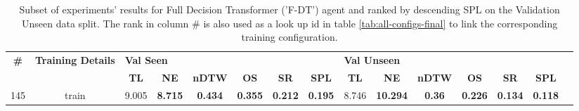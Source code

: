 \begin{table}
\centering
\caption{\label{tab:f_dt_action_for_final_pred}Subset of experiments' results for Full Decision Transformer ('F-DT') agent and ranked by descending SPL on the Validation Unseen data split. The rank in column \# is also used as a look up id in table \ref{tab:all-configs-final} to link the corresponding training configuration.}
\begin{tabular}{@{\hskip3pt}c@{\hskip3pt}c@{\hskip3pt}c@{\hskip3pt}c@{\hskip3pt}c@{\hskip3pt}c@{\hskip3pt}c@{\hskip3pt}c@{\hskip3pt}c@{\hskip3pt}c@{\hskip3pt}c@{\hskip3pt}c@{\hskip3pt}c@{\hskip3pt}c@{\hskip3pt}c}
\toprule
\textbf{\#} & \textbf{Training Details} & \multicolumn{6}{l}{\textbf{Val Seen}} & \multicolumn{6}{l}{\textbf{Val Unseen}} \\
 \textbf{~} &                \textbf{~} &       \textbf{TL} &     \textbf{NE} &   \textbf{nDTW} &     \textbf{OS} &     \textbf{SR} &    \textbf{SPL} &         \textbf{TL} &      \textbf{NE} &  \textbf{nDTW} &     \textbf{OS} &     \textbf{SR} &    \textbf{SPL} \\
\midrule
        145 &                     train &             9.005 &  \textbf{8.715} &  \textbf{0.434} &  \textbf{0.355} &  \textbf{0.212} &  \textbf{0.195} &               8.746 &  \textbf{10.294} &  \textbf{0.36} &  \textbf{0.226} &  \textbf{0.134} &  \textbf{0.118} \\
\bottomrule
\end{tabular}
\end{table}
